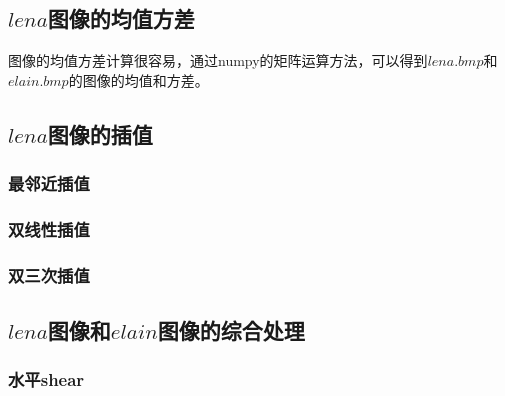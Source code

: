 \documentclass[UTF8]{ctexart}
\begin{document}
\subsection{$lena$图像的均值方差}

图像的均值方差计算很容易，通过numpy的矩阵运算方法，可以得到$lena.bmp$和$elain.bmp$的图像的均值和方差。

\begin{table}[h!]

\end{table}

\subsection{$lena$图像的插值}

\subsubsection{最邻近插值}

\subsubsection{双线性插值}

\subsubsection{双三次插值}

\subsection{$lena$图像和$elain$图像的综合处理}

\subsubsection{水平shear}
\end{document}

